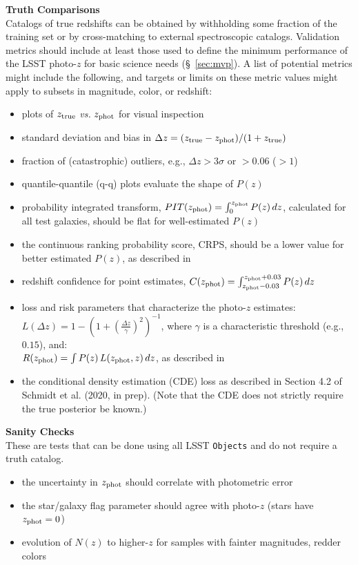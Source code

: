 \documentclass[DM,lsstdraft,toc]{lsstdoc}
\begin{document}
{\bf Truth Comparisons}\\
Catalogs of true redshifts can be obtained by withholding some fraction of the training set or by cross-matching to external spectroscopic catalogs. Validation metrics should include at least those used to define the minimum performance of the LSST photo-$z$ for basic science needs (\S~\ref{sec:mvp}). A list of potential metrics might include the following, and targets or limits on these metric values might apply to subsets in magnitude, color, or redshift: 
\vspace{-15pt}
\begin{itemize}
\item plots of $z_{\rm true}$ {\it vs.} $z_{\rm phot}$ for visual inspection
\item standard deviation and bias in $\Delta z = (z_{\rm true}-z_{\rm phot})/(1+z_{\rm true})$
\item fraction of (catastrophic) outliers, e.g., $\Delta z > 3\sigma$ or $>0.06$ ($>1$)
\item quantile-quantile (q-q) plots evaluate the shape of $P(z)$
\item probability integrated transform, $PIT(z_{\rm phot}) = \int_{0}^{z_{\rm phot}} P(z)\,dz$, calculated for all test galaxies, should be flat for well-estimated $P(z)$ \citep{2016arXiv160808016P}
\item the continuous ranking probability score, CRPS, should be a lower value for better estimated $P(z)$, as described in \citep{2016arXiv160808016P}
\item redshift confidence for point estimates, $C(z_{\rm phot}) = \int_{z_{\rm phot}-0.03}^{z_{\rm phot}+0.03} P(z)\,dz $
\item loss and risk parameters that characterize the photo-$z$ estimates:\\
$L(\Delta z) = 1 - \left(1+ \left(\frac{\Delta z}{\gamma} \right)^2 \right)^{-1}$, 
where $\gamma$ is a characteristic threshold (e.g., $0.15$), and:\\
$R(z_{\rm phot}) = \int P(z)\,L(z_{\rm phot},z)\,dz$, as described in \citet{2018PASJ...70S...9T}
\item the conditional density estimation (CDE) loss as described in Section 4.2 of Schmidt et al. (2020, in prep). (Note that the CDE does not strictly require the true posterior be known.)
\end{itemize}

{\bf Sanity Checks}\\
These are tests that can be done using all LSST {\tt Objects} and do not require a truth catalog.
\vspace{-15pt}
\begin{itemize}
\item the uncertainty in $z_{\rm phot}$ should correlate with photometric error
\item the star/galaxy flag parameter should agree with photo-$z$ (stars have $z_{\rm phot}=0$)
\item evolution of $N(z)$ to higher-$z$ for samples with fainter magnitudes, redder colors
\end{itemize}
\end{document}
